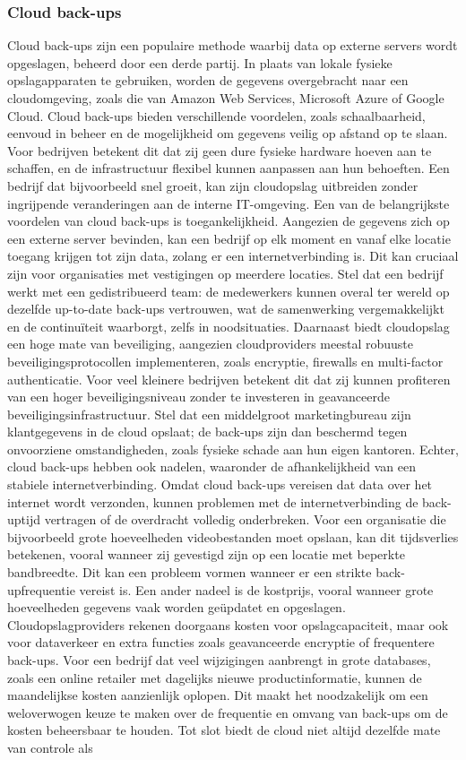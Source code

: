 \subsubsection{Cloud back-ups}
Cloud back-ups zijn een populaire methode waarbij data op externe servers wordt opgeslagen, beheerd door een derde partij. In plaats van lokale fysieke opslagapparaten te gebruiken, worden de gegevens overgebracht naar een cloudomgeving, zoals die van Amazon Web Services, Microsoft Azure of Google Cloud. Cloud back-ups bieden verschillende voordelen, zoals schaalbaarheid, eenvoud in beheer en de mogelijkheid om gegevens veilig op afstand op te slaan. Voor bedrijven betekent dit dat zij geen dure fysieke hardware hoeven aan te schaffen, en de infrastructuur flexibel kunnen aanpassen aan hun behoeften. Een bedrijf dat bijvoorbeeld snel groeit, kan zijn cloudopslag uitbreiden zonder ingrijpende veranderingen aan de interne IT-omgeving. Een van de belangrijkste voordelen van cloud back-ups is toegankelijkheid. Aangezien de gegevens zich op een externe server bevinden, kan een bedrijf op elk moment en vanaf elke locatie toegang krijgen tot zijn data, zolang er een internetverbinding is. Dit kan cruciaal zijn voor organisaties met vestigingen op meerdere locaties. Stel dat een bedrijf werkt met een gedistribueerd team: de medewerkers kunnen overal ter wereld op dezelfde up-to-date back-ups vertrouwen, wat de samenwerking vergemakkelijkt en de continuïteit waarborgt, zelfs in noodsituaties. Daarnaast biedt cloudopslag een hoge mate van beveiliging, aangezien cloudproviders meestal robuuste beveiligingsprotocollen implementeren, zoals encryptie, firewalls en multi-factor authenticatie. Voor veel kleinere bedrijven betekent dit dat zij kunnen profiteren van een hoger beveiligingsniveau zonder te investeren in geavanceerde beveiligingsinfrastructuur. Stel dat een middelgroot marketingbureau zijn klantgegevens in de cloud opslaat; de back-ups zijn dan beschermd tegen onvoorziene omstandigheden, zoals fysieke schade aan hun eigen kantoren. Echter, cloud back-ups hebben ook nadelen, waaronder de afhankelijkheid van een stabiele internetverbinding. Omdat cloud back-ups vereisen dat data over het internet wordt verzonden, kunnen problemen met de internetverbinding de back-uptijd vertragen of de overdracht volledig onderbreken. Voor een organisatie die bijvoorbeeld grote hoeveelheden videobestanden moet opslaan, kan dit tijdsverlies betekenen, vooral wanneer zij gevestigd zijn op een locatie met beperkte bandbreedte. Dit kan een probleem vormen wanneer er een strikte back-upfrequentie vereist is. Een ander nadeel is de kostprijs, vooral wanneer grote hoeveelheden gegevens vaak worden geüpdatet en opgeslagen. Cloudopslagproviders rekenen doorgaans kosten voor opslagcapaciteit, maar ook voor dataverkeer en extra functies zoals geavanceerde encryptie of frequentere back-ups. Voor een bedrijf dat veel wijzigingen aanbrengt in grote databases, zoals een online retailer met dagelijks nieuwe productinformatie, kunnen de maandelijkse kosten aanzienlijk oplopen. Dit maakt het noodzakelijk om een weloverwogen keuze te maken over de frequentie en omvang van back-ups om de kosten beheersbaar te houden. Tot slot biedt de cloud niet altijd dezelfde mate van controle als 